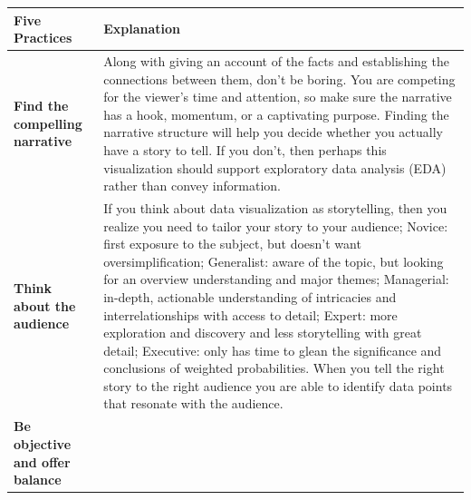 \documentclass[]{book}
\begin{document}
\begin{longtable}[]{@{}ll@{}}
\toprule
\begin{minipage}[b]{0.19\columnwidth}\raggedright
\textbf{Five Practices}\strut
\end{minipage} & \begin{minipage}[b]{0.75\columnwidth}\raggedright
\textbf{Explanation}\strut
\end{minipage}\tabularnewline
\midrule
\endhead
\begin{minipage}[t]{0.19\columnwidth}\raggedright
\textbf{Find the compelling narrative}\strut
\end{minipage} & \begin{minipage}[t]{0.75\columnwidth}\raggedright
Along with giving an account of the facts and establishing the connections between them, don't be boring. You are competing for the viewer's time and attention, so make sure the narrative has a hook, momentum, or a captivating purpose. Finding the narrative structure will help you decide whether you actually have a story to tell. If you don't, then perhaps this visualization should support exploratory data analysis (EDA) rather than convey information.\strut
\end{minipage}\tabularnewline
\begin{minipage}[t]{0.19\columnwidth}\raggedright
\textbf{Think about the audience}\strut
\end{minipage} & \begin{minipage}[t]{0.75\columnwidth}\raggedright
If you think about data visualization as storytelling, then you realize you need to tailor your story to your audience; Novice: first exposure to the subject, but doesn't want oversimplification; Generalist: aware of the topic, but looking for an overview understanding and major themes; Managerial: in-depth, actionable understanding of intricacies and interrelationships with access to detail; Expert: more exploration and discovery and less storytelling with great detail; Executive: only has time to glean the significance and conclusions of weighted probabilities. When you tell the right story to the right audience you are able to identify data points that resonate with the audience.\strut
\end{minipage}\tabularnewline
\begin{minipage}[t]{0.19\columnwidth}\raggedright
\textbf{Be objective and offer balance}\strut
\end{minipage} & \begin{minipage}[t]{0.75\columnwidth}\raggedright

\end{minipage}
\end{longtable}
\end{document}
